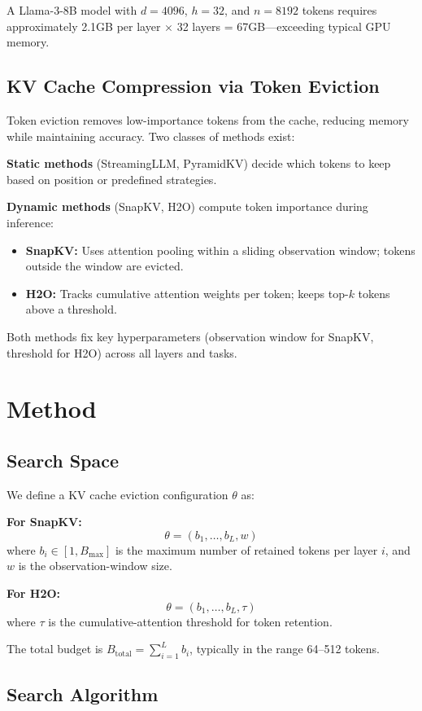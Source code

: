\documentclass[11pt]{article}
\begin{document}
A Llama-3-8B model with $d=4096$, $h=32$, and $n=8192$ tokens requires approximately 2.1GB per layer $\times$ 32 layers = 67GB—exceeding typical GPU memory.

\subsection{KV Cache Compression via Token Eviction}

Token eviction removes low-importance tokens from the cache, reducing memory while maintaining accuracy. Two classes of methods exist:

\textbf{Static methods} (StreamingLLM, PyramidKV) decide which tokens to keep based on position or predefined strategies.

\textbf{Dynamic methods} (SnapKV, H2O) compute token importance during inference:
\begin{itemize}
    \item \textbf{SnapKV:} Uses attention pooling within a sliding observation window; tokens outside the window are evicted.
    \item \textbf{H2O:} Tracks cumulative attention weights per token; keeps top-$k$ tokens above a threshold.
\end{itemize}

Both methods fix key hyperparameters (observation window for SnapKV, threshold for H2O) across all layers and tasks.

\section{Method}

\subsection{Search Space}

We define a KV cache eviction configuration $\theta$ as:

\textbf{For SnapKV:}
\[
\theta = (b_1, \ldots, b_L, w)
\]
where $b_i \in [1, B_{\max}]$ is the maximum number of retained tokens per layer $i$, and $w$ is the observation-window size.

\textbf{For H2O:}
\[
\theta = (b_1, \ldots, b_L, \tau)
\]
where $\tau$ is the cumulative-attention threshold for token retention.

The total budget is $B_{\text{total}} = \sum_{i=1}^L b_i$, typically in the range 64–512 tokens.

\subsection{Search Algorithm}
\end{document}
